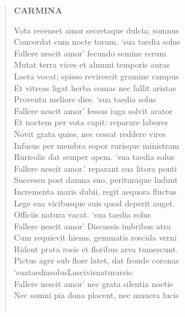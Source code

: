 \documentclass[11pt, a4paper]{report}
\begin{document}
\begin{verse}
    \begin{center} \textbf{CARMINA} \end{center} \marginpar{[116]} Vota recenset amor secretaque dulcia; somnus \\ Concordat cum nocte torum. ‘sua taedia solus \\ Fallere nescit amor’ fecundo semine rerum \\ Mutat terra vices et alumni temporis auras \\ Laeta vocat; spisso revirescit gramine campus \\ Et vitreas ligat herba comas nec fallit aristas \\ Proventu meliore dies. ‘sua taedia solus \\ Fallere nescit amor’ fessus iuga solvit arator \\ Et noctem per vota capit: reparare labores \\ Novit grata quies, nec cessat reddere vires \\ Infusus per membra sopor rurisque ministram \\ Ruricolis dat semper opem. ‘sua taedia solus \\ Fallere nescit amor.’ reparant sua litora ponti \\ Successu post damna suo, perituraque ludunt \\ Incrementa maris dubii, regit aequora fluctus \\ Lege sua vicibusque suis quod deperit auget. \\ Officiis natura vacat. ‘sua taedia solus \\ Fallere nescit amor’  \lbrack Discussis imbribus atra \\ Cum requievit hiems, \rbrack  gemmatis roscida verni \\ Rident prata rosis et floribus arva tumescunt. \\ Pictus ager sub flore latet, dat fronde coronas \\ ‘suataediasolusLascivisnaturarsis: \\ Fallere nescit amor’ nec grata silentia noctis \\ Nec somni pia dona placent, nec munera lucis \\ 
        ﻿\pagebreak 

\end{verse}
\end{document}
